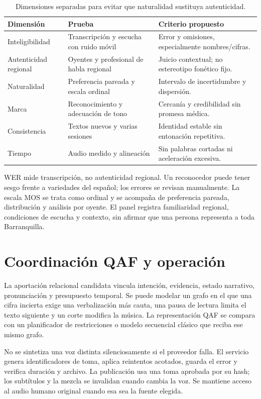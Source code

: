 \begin{table}[ht]\centering\compacttable
\begin{tabular}{p{.24\linewidth}p{.37\linewidth}p{.29\linewidth}}\toprule
Dimensión & Prueba & Criterio propuesto \\\midrule
Inteligibilidad & Transcripción y escucha con ruido móvil & Error y omisiones, especialmente nombres/cifras.\\
Autenticidad regional & Oyentes y profesional de habla regional & Juicio contextual; no estereotipo fonético fijo.\\
Naturalidad & Preferencia pareada y escala ordinal & Intervalo de incertidumbre y dispersión.\\
Marca & Reconocimiento y adecuación de tono & Cercanía y credibilidad sin promesa médica.\\
Consistencia & Textos nuevos y varias sesiones & Identidad estable sin entonación repetitiva.\\
Tiempo & Audio medido y alineación & Sin palabras cortadas ni aceleración excesiva.\\\bottomrule
\end{tabular}\caption{Dimensiones separadas para evitar que naturalidad sustituya autenticidad.}
\end{table}

WER mide transcripción, no autenticidad regional. Un reconocedor puede tener sesgo frente a variedades del español; los errores se revisan manualmente. La escala MOS se trata como ordinal y se acompaña de preferencia pareada, distribución y análisis por oyente. El panel registra familiaridad regional, condiciones de escucha y contexto, sin afirmar que una persona representa a toda Barranquilla.

\section{Coordinación QAF y operación}
La aportación relacional candidata vincula intención, evidencia, estado narrativo, pronunciación y presupuesto temporal. Se puede modelar un grafo en el que una cifra incierta exige una verbalización más cauta, una pausa de lectura limita el texto siguiente y un corte modifica la música. La representación QAF se compara con un planificador de restricciones o modelo secuencial clásico que reciba ese mismo grafo.

No se sintetiza una voz distinta silenciosamente si el proveedor falla. El servicio genera identificadores de toma, aplica reintentos acotados, guarda el error y verifica duración y archivo. La publicación usa una toma aprobada por su hash; los subtítulos y la mezcla se invalidan cuando cambia la voz. Se mantiene acceso al audio humano original cuando esa sea la fuente elegida.

